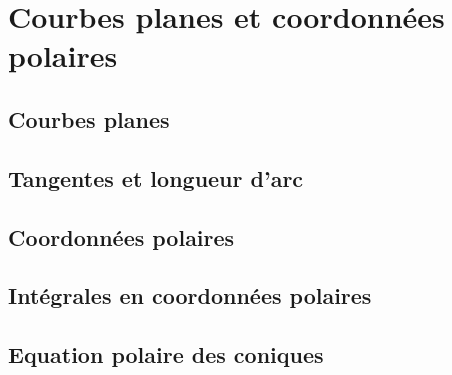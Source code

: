 \chapter{Courbes planes et coordonnées polaires}
\section{Courbes planes}
\section{Tangentes et longueur d'arc}
\section{Coordonnées polaires}
\section{Intégrales en coordonnées polaires}
\section{Equation polaire des coniques}